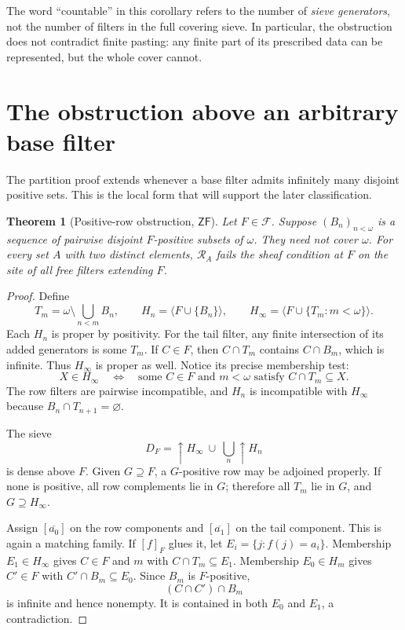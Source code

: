 \documentclass[11pt,letterpaper]{article}
\newtheorem{theorem}{Theorem}[section]
\theoremstyle{definition}
\theoremstyle{remark}
\newcommand{\om}{\omega}
\newcommand{\cF}{\mathcal F}
\newcommand{\RA}{\mathscr R_A}
\newcommand{\gen}[1]{\langle #1\rangle}
\newcommand{\const}[1]{\overline{#1}}
\newcommand{\ZF}{\mathsf{ZF}}
\begin{document}
The word ``countable'' in this corollary refers to the number of
\emph{sieve generators}, not the number of filters in the full covering
sieve. In particular, the obstruction does not contradict finite pasting:
any finite part of its prescribed data can be represented, but the whole
cover cannot.

\section{The obstruction above an arbitrary base filter}
\label{sec:antichain}

The partition proof extends whenever a base filter admits infinitely many
disjoint positive sets. This is the local form that will support the later
classification.

\begin{theorem}[Positive-row obstruction, $\ZF$]\label{thm:positive-rows}
Let $F\in\cF$. Suppose $(B_n)_{n<\om}$ is a sequence of pairwise
disjoint $F$-positive subsets of $\om$. They need not cover $\om$.
For every set $A$ with two distinct elements, $\RA$ fails the sheaf
condition at $F$ on the site of all free filters extending $F$.
\end{theorem}
\begin{proof}
Define
\[
 T_m=\om\setminus\bigcup_{n<m}B_n,\qquad
 H_n=\gen{F\cup\{B_n\}},\qquad
 H_\infty=\gen{F\cup\{T_m:m<\om\}}.
\]
Each $H_n$ is proper by positivity. For the tail filter, any finite
intersection of its added generators is some $T_m$. If $C\in F$,
then $C\cap T_m$ contains $C\cap B_m$, which is infinite. Thus
$H_\infty$ is proper as well. Notice its precise membership test:
\begin{equation}\label{eq:general-tail-membership}
 X\in H_\infty
 \quad\Longleftrightarrow\quad
 \text{some }C\in F\text{ and }m<\om\text{ satisfy }C\cap T_m\subseteq X.
\end{equation}
The row filters are pairwise incompatible, and $H_n$ is incompatible
with $H_\infty$ because $B_n\cap T_{n+1}=\varnothing$.

The sieve
\[
 D_F=\uparrow H_\infty\ \cup\ \bigcup_n\uparrow H_n
\]
is dense above $F$. Given $G\supseteq F$, a $G$-positive row may be
adjoined properly. If none is positive, all row complements lie in $G$;
therefore all $T_m$ lie in $G$, and $G\supseteq H_\infty$.

Assign $[\const{a_0}]$ on the row components and $[\const{a_1}]$ on
the tail component. This is again a matching family. If $[f]_F$ glues
it, let $E_i=\{j:f(j)=a_i\}$. Membership $E_1\in H_\infty$ gives
$C\in F$ and $m$ with $C\cap T_m\subseteq E_1$.
Membership $E_0\in H_m$ gives $C'\in F$ with
$C'\cap B_m\subseteq E_0$. Since $B_m$ is $F$-positive,
\[
 (C\cap C')\cap B_m
\]
is infinite and hence nonempty. It is contained in both $E_0$ and
$E_1$, a contradiction.
\end{proof}
\end{document}
